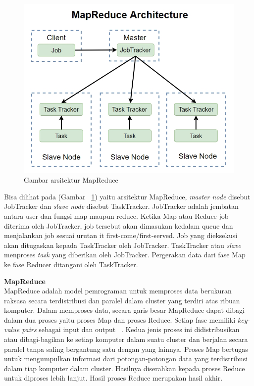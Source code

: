 \documentclass[a4paper,twoside]{article}
\begin{document}
\begin{enumerate}
\begin{figure}[H]
    \centering  
    \includegraphics[scale=0.5]{mapreducehadoop}  
    \caption[Gambar arsitektur MapReduce]{Gambar arsitektur MapReduce} 
    \label{fig:mapreducehadoop} 
\end{figure}

Bisa dilihat pada (Gambar ~\ref{fig:mapreducehadoop}) yaitu arsitektur MapReduce, {\it master node} disebut JobTracker dan {\it slave node} disebut TaskTracker. JobTracker adalah jembatan antara user dan fungsi map maupun reduce. Ketika Map atau Reduce job diterima oleh JobTracker, job tersebut akan dimasukan kedalam queue dan menjalankan job sesuai urutan {it first-come/first-served}. Job yang dieksekusi akan ditugaskan kepada TaskTracker oleh JobTracker. TaskTracker atau {\it slave} menproses {\it task} yang diberikan oleh JobTracker. Pergerakan data dari fase Map ke fase Reducer ditangani oleh TaskTracker.  

\textbf{MapReduce}\\

MapReduce adalah model pemrograman untuk memproses data berukuran raksasa secara terdistribusi dan paralel dalam cluster yang terdiri atas ribuan komputer. Dalam memproses data, secara garis besar MapReduce dapat dibagi dalam dua proses yaitu proses Map dan proses Reduce. Setiap fase memiliki \textit{key-value pairs} sebagai input dan output ~\cite{tomwhite:02:htdg}. Kedua jenis proses ini didistribusikan atau dibagi-bagikan ke setiap komputer dalam suatu cluster dan berjalan secara paralel tanpa saling bergantung satu dengan yang lainnya. Proses Map bertugas untuk mengumpulkan informasi dari potongan-potongan data yang terdistribusi dalam tiap komputer dalam cluster. Hasilnya diserahkan kepada proses Reduce untuk diproses lebih lanjut. Hasil proses Reduce merupakan hasil akhir.\\


\end{enumerate}
\end{document}

